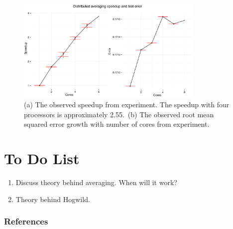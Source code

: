 \documentclass{article} %
\begin{document}
\begin{figure}[htb]
\centering
\includegraphics[width=0.8\textwidth]{../../dist_avg.pdf}
\caption{(a) The observed speedup from experiment. The speedup with four processors is approximately 2.55.~(b) The observed root mean squared error growth with number of cores from experiment.}
\label{res}
\end{figure}

\section{To Do List}
\begin{enumerate}
\item Discuss theory behind averaging. When will it work?
\item Theory behind Hogwild.
\end{enumerate}


\subsubsection*{References}

\begingroup
\renewcommand{\section}[2]{}%


\endgroup
\end{document}
